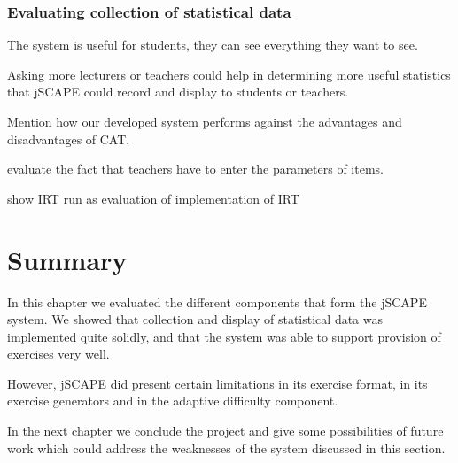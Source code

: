 \subsubsection{Evaluating collection of statistical data}
The system is useful for students, they can see everything they want to see.


Asking more lecturers or teachers could help in determining more useful statistics that jSCAPE could record and display to students or teachers.



Mention how our developed system performs against the advantages and disadvantages of CAT.


evaluate the fact that teachers have to enter the parameters of items.

show IRT run as evaluation of implementation of IRT


\section{Summary}
In this chapter we evaluated the different components that form the jSCAPE system. We showed that collection and display of statistical data was implemented quite solidly, and that the system was able to support provision of exercises very well.\newline

However, jSCAPE did present certain limitations in its exercise format, in its exercise generators and in the adaptive difficulty component. \newline

In the next chapter we conclude the project and give some possibilities of future work which could address the weaknesses of the system discussed in this section.